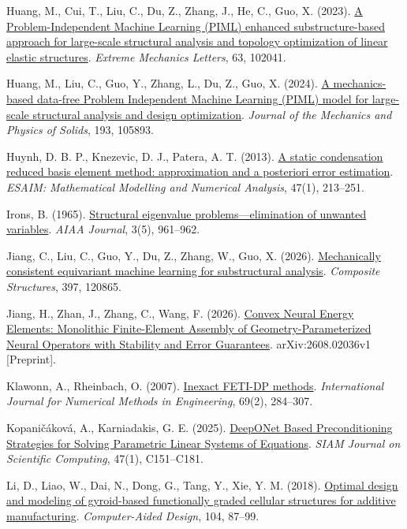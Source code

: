 \documentclass[preprint,12pt,authoryear]{elsarticle}
\begin{document}
Huang, M., Cui, T., Liu, C., Du, Z., Zhang, J., He, C., Guo, X. (2023). \href{https://doi.org/10.1016/j.eml.2023.102041}{A Problem-Independent Machine Learning (PIML) enhanced substructure-based approach for large-scale structural analysis and topology optimization of linear elastic structures}. \emph{Extreme Mechanics Letters}, 63, 102041.

Huang, M., Liu, C., Guo, Y., Zhang, L., Du, Z., Guo, X. (2024). \href{https://doi.org/10.1016/j.jmps.2024.105893}{A mechanics-based data-free Problem Independent Machine Learning (PIML) model for large-scale structural analysis and design optimization}. \emph{Journal of the Mechanics and Physics of Solids}, 193, 105893.

Huynh, D. B. P., Knezevic, D. J., Patera, A. T. (2013). \href{https://doi.org/10.1051/m2an/2012022}{A static condensation reduced basis element method: approximation and a posteriori error estimation}. \emph{ESAIM: Mathematical Modelling and Numerical Analysis}, 47(1), 213--251.

Irons, B. (1965). \href{https://doi.org/10.2514/3.3027}{Structural eigenvalue problems---elimination of unwanted variables}. \emph{AIAA Journal}, 3(5), 961--962.

Jiang, C., Liu, C., Guo, Y., Du, Z., Zhang, W., Guo, X. (2026). \href{https://doi.org/10.1016/j.compstruct.2026.120865}{Mechanically consistent equivariant machine learning for substructural analysis}. \emph{Composite Structures}, 397, 120865.

Jiang, H., Zhan, J., Zhang, C., Wang, F. (2026). \href{https://arxiv.org/abs/2608.02036v1}{Convex Neural Energy Elements: Monolithic Finite-Element Assembly of Geometry-Parameterized Neural Operators with Stability and Error Guarantees}. arXiv:2608.02036v1 {[}Preprint{]}.

Klawonn, A., Rheinbach, O. (2007). \href{https://doi.org/10.1002/nme.1758}{Inexact FETI-DP methods}. \emph{International Journal for Numerical Methods in Engineering}, 69(2), 284--307.

Kopaničáková, A., Karniadakis, G. E. (2025). \href{https://doi.org/10.1137/24m162861x}{DeepONet Based Preconditioning Strategies for Solving Parametric Linear Systems of Equations}. \emph{SIAM Journal on Scientific Computing}, 47(1), C151--C181.

Li, D., Liao, W., Dai, N., Dong, G., Tang, Y., Xie, Y. M. (2018). \href{https://doi.org/10.1016/j.cad.2018.06.003}{Optimal design and modeling of gyroid-based functionally graded cellular structures for additive manufacturing}. \emph{Computer-Aided Design}, 104, 87--99.
\end{document}
